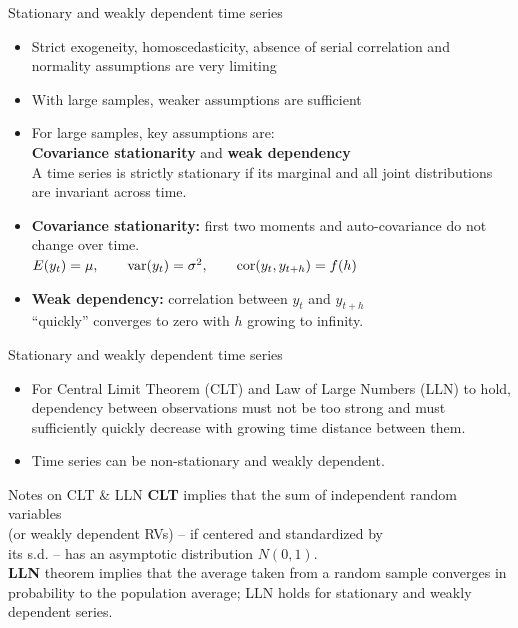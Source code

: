 \documentclass{beamer}
\begin{document}
\begin{frame}{Stationary and weakly dependent time series}
\begin{itemize}
\item Strict exogeneity, homoscedasticity, absence of serial correlation and normality assumptions are very limiting 
\medskip
\item With large samples, weaker assumptions are sufficient
\medskip
\item For large samples, key assumptions are: \\ \textbf{Covariance stationarity} and \textbf{weak dependency}\\
\medskip
A time series is strictly stationary if its marginal and all joint distributions are invariant across time.
\medskip
\item \textbf{Covariance stationarity:} first two moments and auto-covariance do not change over time.\\
$E(y_t)= \mu,\qquad \textnormal{var}(y_t) = \sigma^2,\qquad \textnormal{cor}(y_t,y_{t+h})=f(h)$
\medskip
\item \textbf{Weak dependency:} correlation between $y_t$ and $y_{t+h}$ \\``quickly'' converges to zero with $h$ growing to infinity.
\end{itemize}
\end{frame}
\begin{frame}{Stationary and weakly dependent time series}
\begin{itemize}
\item For Central Limit Theorem (CLT) and Law of Large Numbers (LLN) to hold, dependency between observations must not be too strong and must sufficiently quickly decrease with growing time distance between them.
\medskip
\item Time series can be non-stationary and weakly dependent.
\end{itemize}
\begin{block}{Notes on CLT \& LLN}
\textbf{CLT} implies that the sum of independent random variables \\(or weakly dependent RVs) -- if centered and standardized by \\its s.d. -- has an asymptotic distribution $N(0,1)$.\\ \vspace{0.1cm}
\textbf{LLN} theorem implies that the average taken from a random sample converges in probability to the population average; LLN holds for stationary and weakly dependent series.
\end{block}
\end{frame}
\end{document}
